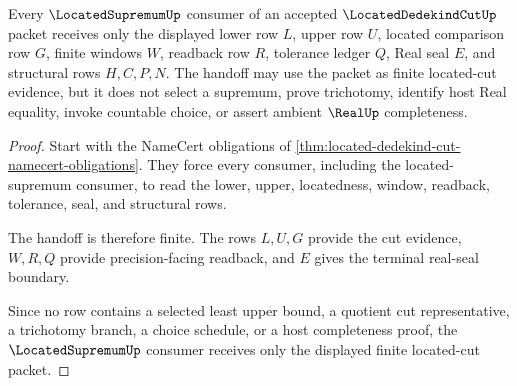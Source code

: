 \begin{theorem}
\label{thm:located-dedekind-cut-supremum-handoff}
Every $\LocatedSupremumUp$ consumer of an accepted $\LocatedDedekindCutUp$ packet receives only the displayed lower row $L$, upper row $U$, located comparison row $G$, finite windows $W$, readback row $R$, tolerance ledger $Q$, Real seal $E$, and structural rows $H,C,P,N$. The handoff may use the packet as finite located-cut evidence, but it does not select a supremum, prove trichotomy, identify host Real equality, invoke countable choice, or assert ambient $\RealUp$ completeness.
\end{theorem}
\begin{proof}
Start with the NameCert obligations of \autoref{thm:located-dedekind-cut-namecert-obligations}. They force every consumer, including the located-supremum consumer, to read the lower, upper, locatedness, window, readback, tolerance, seal, and structural rows.

The handoff is therefore finite. The rows $L,U,G$ provide the cut evidence, $W,R,Q$ provide precision-facing readback, and $E$ gives the terminal real-seal boundary.

Since no row contains a selected least upper bound, a quotient cut representative, a trichotomy branch, a choice schedule, or a host completeness proof, the $\LocatedSupremumUp$ consumer receives only the displayed finite located-cut packet.
\end{proof}




